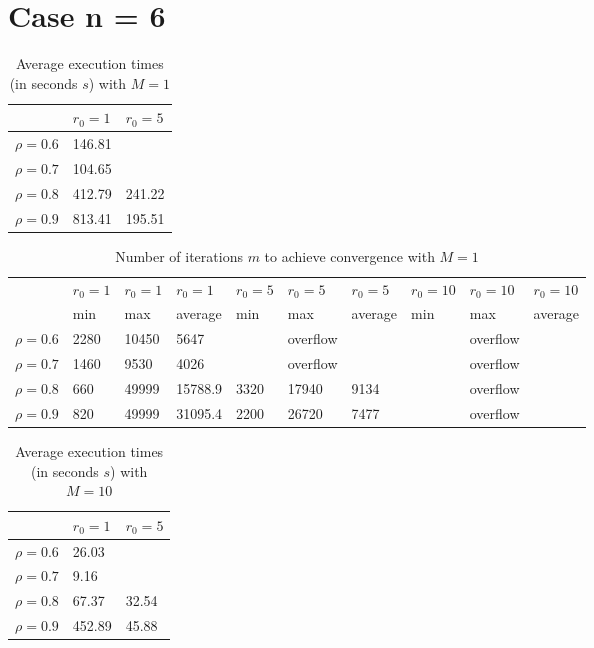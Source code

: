 \documentclass[a4paper,11pt,openright]{report}
\begin{document}
\section*{Case n = 6} 
\begin{table}[H]
\centering
\addtolength{\leftskip}{-1.5cm}
\addtolength{\rightskip}{-1.5cm}
\begin{tabular}{|c|ll|}
\hline
$ $ & $r_0 = 1$ & $r_0 = 5$  \\
\hline
$\rho = 0.6$ & 146.81 & \\

$\rho = 0.7$ & 104.65 & \\

$\rho = 0.8$ & 412.79 & 241.22 \\

$\rho = 0.9$ & 813.41 & 195.51 \\
\hline
\end{tabular}
\caption{Average execution
 times (in seconds $s$) with $M = 1$}
\end{table}
\begin{table}[H]
\centering
\addtolength{\leftskip}{-1.5cm}
\addtolength{\rightskip}{-1.5cm}
\begin{tabular}{|c|lllllllll|}
\hline
$ $ & $r_0 = 1$ & $r_0 = 1$ & $r_0 = 1$ & $r_0 = 5$ & $r_0 = 5$ & $r_0 = 5$ & $r_0 = 10$ & $r_0 = 10$ & $r_0 = 10$  \\
$ $ & min & max & average & min & max & average & min & max & average \\ 
\hline
$\rho = 0.6$ & 2280 & 10450 & 5647 &  & overflow &  &  & overflow &  \\

$\rho = 0.7$ & 1460 & 9530 & 4026 &  & overflow &  &  & overflow &  \\

$\rho = 0.8$ & 660 & 49999 & 15788.9 & 3320 & 17940 & 9134 &  & overflow &  \\

$\rho = 0.9$ & 820 & 49999 & 31095.4 & 2200 & 26720 & 7477 &  & overflow &  \\
\hline
\end{tabular}
\caption{Number of iterations $m$ to achieve convergence with $M = 1$}
\end{table}
\begin{table}[H]
\centering
\addtolength{\leftskip}{-1.5cm}
\addtolength{\rightskip}{-1.5cm}
\begin{tabular}{|c|ll|}
\hline
$ $ & $r_0 = 1$ & $r_0 = 5$  \\
\hline
$\rho = 0.6$ & 26.03 & \\

$\rho = 0.7$ & 9.16 & \\

$\rho = 0.8$ & 67.37 & 32.54 \\

$\rho = 0.9$ & 452.89 & 45.88 \\
\hline
\end{tabular}
\caption{Average execution
 times (in seconds $s$) with $M = 10$}
\end{table}
\end{document}
